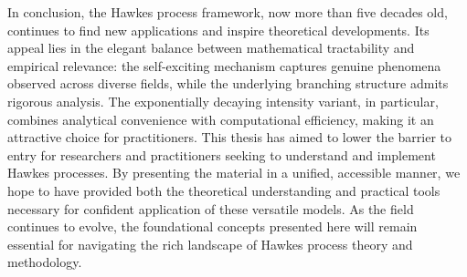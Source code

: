 \documentclass[12pt,a4paper]{report}
\theoremstyle{plain}
\theoremstyle{definition}
\theoremstyle{remark}
\newcommand{\1}{\mathbf{1}}
\begin{document}
\medskip
\medskip
\noindent
In conclusion, the Hawkes process framework, now more than five decades old, continues to find new applications and inspire theoretical developments. Its appeal lies in the elegant balance between mathematical tractability and empirical relevance: the self-exciting mechanism captures genuine phenomena observed across diverse fields, while the underlying branching structure admits rigorous analysis. The exponentially decaying intensity variant, in particular, combines analytical convenience with computational efficiency, making it an attractive choice for practitioners. This thesis has aimed to lower the barrier to entry for researchers and practitioners seeking to understand and implement Hawkes processes. By presenting the material in a unified, accessible manner, we hope to have provided both the theoretical understanding and practical tools necessary for confident application of these versatile models. As the field continues to evolve, the foundational concepts presented here will remain essential for navigating the rich landscape of Hawkes process theory and methodology.
\end{document}
